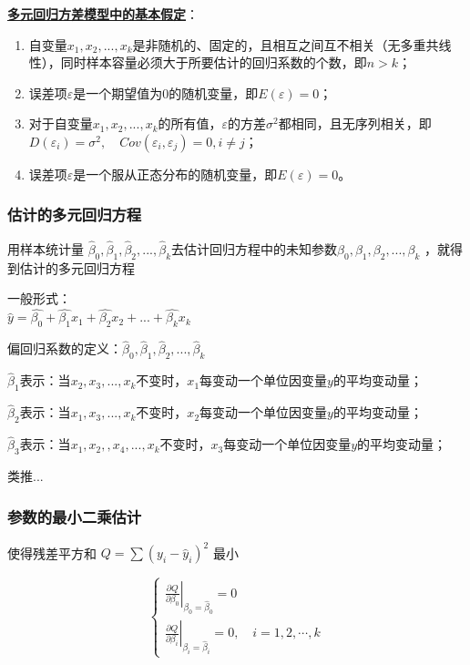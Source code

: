 \documentclass[UTF8,10pt]{book}
\begin{document}
\textbf{\underline{多元回归方差模型中的基本假定}}：

\begin{enumerate}
	\def\labelenumi{\arabic{enumi}.}
	\item
	自变量\(x_1,x_2,...,x_k\)是非随机的、固定的，且相互之间互不相关（无多重共线性），同时样本容量必须大于所要估计的回归系数的个数，即\(n>k\)；
	\item
	误差项\(\varepsilon\)是一个期望值为\(0\)的随机变量，即\(E(\varepsilon)=0\)；
	\item
	对于自变量\(x_1,x_2,...,x_k\)的所有值，\(\varepsilon\)的方差\(\sigma^2\)都相同，且无序列相关，即\(D(\varepsilon_i) = \sigma^2 ,\quad Cov(\varepsilon_i,\varepsilon_j)=0,i \neq j\)；
	\item
	误差项\(\varepsilon\)是一个服从正态分布的随机变量，即\(E(\varepsilon)=0\)。
\end{enumerate}

\subsubsection{估计的多元回归方程}\label{header-n159}

用样本统计量
\( \hat{\beta}_0,\hat{\beta}_1,\hat{\beta}_2,...,\hat{\beta}_k \)去估计回归方程中的未知参数\( \beta_0,\beta_1,\beta_2,...,\beta_k\)
，就得到估计的多元回归方程

一般形式：\\
\( \hat{y} = \hat{\beta_0} + \hat{\beta_1} x_1 + \hat{\beta_2} x_2 + ... + \hat{\beta_k} x_k \)

偏回归系数的定义：\( \hat{\beta}_0,\hat{\beta}_1,\hat{\beta}_2,...,\hat{\beta}_k \)

\(\hat{\beta}_1\)表示：当\( x_2,x_3,...,x_k\)不变时，\(x_1\)每变动一个单位因变量\(y\)的平均变动量；

\(\hat{\beta}_2\)表示：当\( x_1,x_3,...,x_k\)不变时，\(x_2\)每变动一个单位因变量\(y\)的平均变动量；

\(\hat{\beta}_3\)表示：当\( x_1,x_2,,x_4,...,x_k\)不变时，\(x_3\)每变动一个单位因变量\(y\)的平均变动量；

类推...

\subsubsection{参数的最小二乘估计}\label{header-n167}

使得残差平方和 \(Q = \sum (y_i - \hat{y}_i)^2\) 最小

\[\left\{\begin{array}{l}
\left.\frac{\partial Q}{\partial \beta_{0}}\right|_{\beta_{0}=\hat{\beta}_{0}}=0 \\
\left.\frac{\partial Q}{\partial \beta_{i}}\right|_{\beta_{i}=\hat{\beta}_{i}}=0, \quad i=1,2, \cdots, k
\end{array}\right.\]
\end{document}
